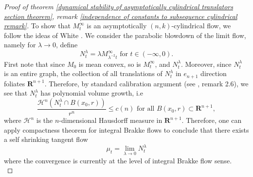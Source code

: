 \documentclass[pdflatex,sn-mathphys-num]{sn-jnl}%
\begin{document}
\begin{proof}[Proof of theorem \ref{dynamical stability of asymptotically cylindrical translators section theorem}, remark \ref{independence of constants to subsequence cylindrical remark}]
To show that $M^{\infty}_t$ is an asymptotically $(n,k)$-cylindrical flow, we follow the ideas of White \cite{White2000TheSO}. We consider the parabolic blowdown of the limit flow, namely for $\lambda \to 0$, define
\begin{equation}
    N^{\lambda}_t = \lambda M^{\infty}_{\lambda^{-2}t} \text{ for }t \in (-\infty, 0).
\end{equation}
First note that since $M_0$ is mean convex, so is $M^{\infty}_t$, and $N^{\lambda}_t$. Moreover, since $N^{\lambda}_t$ is an entire graph, the collection of all translations of $N^{\lambda}_t$ in $e_{n+1}$ direction foliates $\mathbf{R}^{n+1}$. Therefore, by standard calibration argument (see \cite{Haslhofer2013MeanCF}, remark 2.6), we see that $N^{\lambda}_t$ has polynomial volume growth, i.e
\begin{equation}
    \frac{\mathcal{H}^n(N^{\lambda}_t\cap B(x_0,r))}{r^n} \leq c(n) \text{ for all }B(x_0, r) \subset \mathbf{R}^{n+1},
\end{equation}
where $\mathcal{H}^n$ is the $n$-dimensional Hausdorff measure in $\mathbf{R}^{n+1}$. Therefore, one can apply compactness theorem for integral Brakke flows to conclude that there exists a self shrinking tangent flow
\begin{equation}
    \mu_t = \lim_{\lambda \to 0}N^{\lambda}_t
\end{equation}
where the convergence is currently at the level of integral Brakke flow sense. \\


\end{proof}
\end{document}
